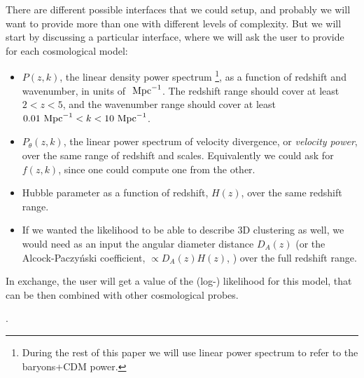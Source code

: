 There are different possible interfaces that we could setup, and probably
we will want to provide more than one with different levels of complexity.
But we will start by discussing a particular interface, where we will ask
the user to provide for each cosmological model:
\begin{itemize}
 \item $P(z,k)$, the linear density power spectrum
  \footnote{During the rest of this paper we will use linear power spectrum
  to refer to the baryons+CDM power.}, as a function of redshift and
  wavenumber, in units of $\ \text{Mpc}^{-1}$.
  The redshift range should cover at least $2 < z < 5$, and the wavenumber
  range should cover at least $0.01 \ \text{Mpc}^{-1} < k < 10 \ \text{Mpc}^{-1}$.
 \item $P_\theta(z,k)$, the linear power spectrum of velocity divergence,
  or \textit{velocity power}, over the same range of redshift and scales.
  Equivalently we could ask for $f(z,k)$, since one could compute one from
  the other.
 \item Hubble parameter as a function of redshift, $H(z)$, over the same
  redshift range.
 \item If we wanted the likelihood to be able to describe 3D clustering as well,
  we would need as an input the angular diameter distance $D_A(z)$ (or the
  Alcock-Paczy\'nski coefficient, $\propto D_A(z) H(z)$, \cite{Alcock1979})
  over the full redshift range.
\end{itemize}
 
In exchange, the user will get a value of the (log-) likelihood for this model,
that can be then combined with other cosmological probes.

.

